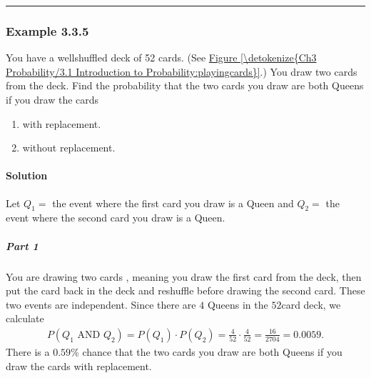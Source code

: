 \documentclass[letterpaper,10pt,english]{jupyterBook}
\begin{document}
\bigskip\hrule\bigskip



\subsubsection{Example 3.3.5}
\label{\detokenize{Ch3 Probability/3.3 Multiplication Rules and Independent Events:example-3-3-5}}
\sphinxAtStartPar
You have a well\sphinxhyphen{}shuffled deck of 52 cards. (See \hyperref[\detokenize{Ch3 Probability/3.1 Introduction to Probability:playingcards}]{Figure \ref{\detokenize{Ch3 Probability/3.1 Introduction to Probability:playingcards}}}.) You draw two cards from the deck. Find the probability that the two cards you draw are both Queens if you draw the cards
\begin{enumerate}
%
\item {} 
\sphinxAtStartPar
with replacement.

\item {} 
\sphinxAtStartPar
without replacement.

\end{enumerate}


\paragraph{Solution}
\label{\detokenize{Ch3 Probability/3.3 Multiplication Rules and Independent Events:id6}}
\sphinxAtStartPar
Let \(Q_1 =\) the event where the first card you draw is a Queen and \(Q_2 =\) the event where the second card you draw is a Queen.


\subparagraph{Part 1}
\label{\detokenize{Ch3 Probability/3.3 Multiplication Rules and Independent Events:id7}}
\sphinxAtStartPar
You are drawing two cards , meaning you draw the first card from the deck, then put the card back in the deck and re\sphinxhyphen{}shuffle before drawing the second card. These two events are independent. Since there are \(4\) Queens in the \(52\)\sphinxhyphen{}card deck, we calculate
\begin{equation*}
\begin{split} P(Q_1 \text{ AND } Q_2) = P(Q_1) \cdot P(Q_2) = \frac{4}{52} \cdot \frac{4}{52} = \frac{16}{2704} = 0.0059. \end{split}
\end{equation*}
\sphinxAtStartPar
There is a \(0.59\%\) chance that the two cards you draw are both Queens if you draw the cards with replacement.
\end{document}

